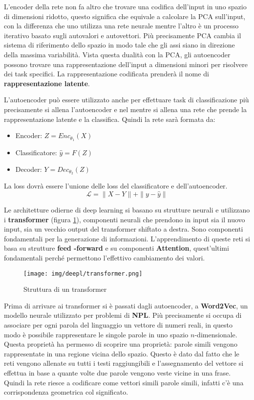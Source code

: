 L'encoder della rete non fa altro che trovare una codifica dell'input in uno
spazio di dimensioni ridotto, questo significa che equivale a calcolare la PCA
sull'input, con la differenza che uno utilizza una rete neurale mentre l'altro
è un processo iterativo basato sugli autovalori e autovettori. Più precisamente
PCA cambia il sistema di riferimento dello spazio in modo tale che gli assi
siano in direzione della massima variabilità. Vista questa dualità con la PCA,
gli autoencoder possono trovare una rappresentazione dell'input a dimensioni
minori per risolvere dei task specifici. La rappresentazione codificata prenderà
il nome di \textbf{rappresentazione latente}.

L'autoencoder può essere utilizzato anche per effettuare task di classificazione
più precisamente si allena l'autoencoder e nel mentre si allena una rete che
prende la rappresentazione latente e la classifica. Quindi la rete sarà formata
da:
\begin{itemize}
      \item Encoder: $Z = Enc_{\theta_1}(X)$
      \item Classificatore: $\hat{y} = F(Z)$
      \item Decoder: $Y = Dec_{\theta_2}(Z)$
\end{itemize}
La loss dovrà essere l'unione delle loss del classificatore e dell'autoencoder.
\begin{equation}
      \mathcal{L} = \| X - Y \| + \| y - \hat{y} \|
\end{equation}

Le architetture odierne di deep learning si basano su strutture neurali e
utilizzano i \textbf{transformer} (figura \ref{fig:transformer}), componenti
neurali che prendono in input sia il nuovo input, sia un vecchio output del
transformer shiftato a destra. Sono componenti fondamentali per la generazione
di informazioni. L'apprendimento di queste reti si basa su strutture \textbf{feed
      -forward} e su componenti \textbf{Attention}, quest'ultimi fondamentali
perché permettono l'effettivo cambiamento dei valori.
\begin{figure}[!ht]
      \centering
      \texttt{[image: img/deepl/transformer.png]}
      \caption{Struttura di un transformer}
      \label{fig:transformer}
\end{figure}
Prima di arrivare ai transformer si è passati dagli autoencoder, a
\textbf{Word2Vec}, un modello neurale utilizzato per problemi di \textbf{NPL}.
Più precisamente si occupa di associare per ogni parola del linguaggio un vettore
di numeri reali, in questo modo è possibile rappresentare le singole parole in
uno spazio $n$-dimensionale. Questa proprietà ha permesso di scoprire una
proprietà: parole simili vengono rappresentate in una regione vicina dello
spazio. Questo è dato dal fatto che le reti vengono allenate su tutti i testi
raggiungibili e l'assegnamento del vettore si effettua in base a quante volte
due parole vengono veste vicine in una frase. Quindi la rete riesce a codificare
come vettori simili parole simili, infatti c'è una corrispondenza geometrica col
significato.

